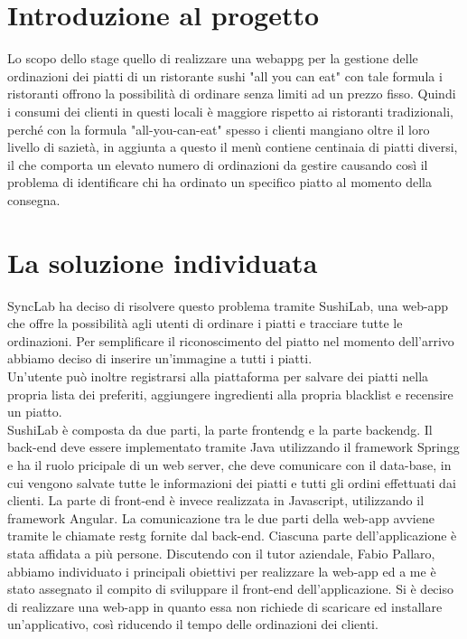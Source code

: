 \section{Introduzione al progetto}
Lo scopo dello stage quello di realizzare una \gls{webappg} per la gestione delle ordinazioni dei piatti di un ristorante sushi "all you can eat" con tale formula i ristoranti offrono la possibilità di ordinare senza limiti ad un prezzo fisso. Quindi i consumi dei clienti in questi locali è maggiore rispetto ai ristoranti tradizionali, perché con la formula "all-you-can-eat" spesso i clienti mangiano oltre il loro livello di sazietà, in aggiunta a questo il menù contiene centinaia di piatti diversi, il che comporta un elevato numero di ordinazioni da gestire causando così il problema di identificare chi ha ordinato un specifico piatto al momento della consegna.

\section{La soluzione individuata}
SyncLab ha deciso di risolvere questo problema tramite SushiLab, una web-app che offre la possibilità agli utenti di ordinare i piatti e tracciare tutte le ordinazioni. Per semplificare il riconoscimento del piatto nel momento dell'arrivo abbiamo deciso di inserire un'immagine a tutti i piatti.\\ 
Un'utente può inoltre registrarsi alla piattaforma per salvare dei piatti nella propria lista dei preferiti, aggiungere ingredienti alla propria blacklist e recensire un piatto.\\
SushiLab è composta da due parti, la parte \gls{frontendg} e la parte \gls{backendg}. Il back-end deve essere implementato tramite Java utilizzando il framework \gls{Springg} e ha il ruolo pricipale di un web server, che deve comunicare con il data-base, in cui vengono salvate tutte le informazioni dei piatti e tutti gli ordini effettuati dai clienti.
La parte di front-end è invece realizzata in Javascript, utilizzando il framework Angular. La comunicazione tra le due parti della web-app avviene tramite le chiamate \gls{restg} fornite dal back-end.
Ciascuna parte dell'applicazione è stata affidata a più persone. Discutendo con il tutor aziendale, Fabio Pallaro, abbiamo individuato i principali obiettivi per realizzare la web-app ed a me è stato assegnato il compito di sviluppare il front-end dell'applicazione. 
Si è deciso di realizzare una web-app in quanto essa non richiede di scaricare ed installare un'applicativo, così riducendo il tempo delle ordinazioni dei clienti.

